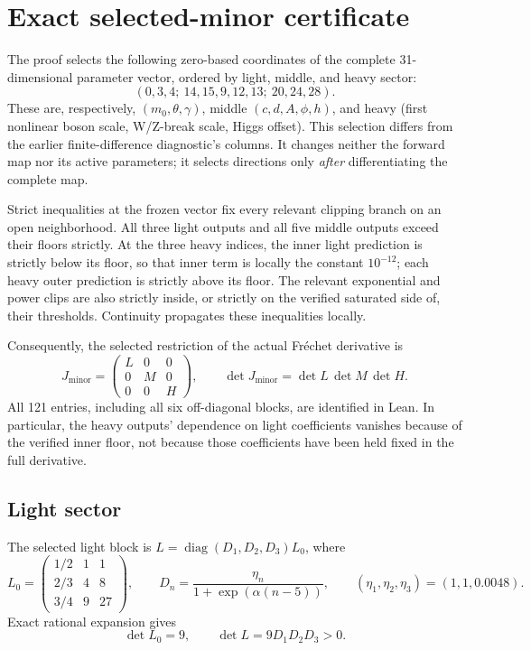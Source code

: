 \documentclass[11pt]{article}
\newcommand{\diag}{\operatorname{diag}}
\begin{document}
\section{Exact selected-minor certificate}
\label{sec:minor}

The proof selects the following zero-based coordinates of the complete
31-dimensional parameter vector, ordered by light, middle, and heavy sector:
\begin{equation}
 (0,3,4;\ 14,15,9,12,13;\ 20,24,28).
 \label{eq:selected}
\end{equation}
These are, respectively, $(m_0,\theta,\gamma)$, middle
$(c,d,A,\phi,h)$, and heavy (first nonlinear boson scale, W/Z-break
scale, Higgs offset). This selection differs from the earlier
finite-difference diagnostic's columns. It changes neither the forward
map nor its active parameters; it selects directions only \emph{after}
differentiating the complete map.

Strict inequalities at the frozen vector fix every relevant clipping
branch on an open neighborhood. All three light outputs and all five
middle outputs exceed their floors strictly. At the three heavy indices,
the inner light prediction is strictly below its floor, so that inner
term is locally the constant $10^{-12}$; each heavy outer prediction
is strictly above its floor. The relevant exponential and power clips
are also strictly inside, or strictly on the verified saturated side of,
their thresholds. Continuity propagates these inequalities locally.

Consequently, the selected restriction of the actual Fr\'echet derivative is
\begin{equation}
 J_{\mathrm{minor}}=
 \begin{pmatrix}L&0&0\\0&M&0\\0&0&H\end{pmatrix},
 \qquad \det J_{\mathrm{minor}}=\det L\,\det M\,\det H.
 \label{eq:block}
\end{equation}
All 121 entries, including all six off-diagonal blocks, are identified
in Lean. In particular, the heavy outputs' dependence on light coefficients
vanishes because of the verified inner floor, not because those coefficients
have been held fixed in the full derivative.

\subsection{Light sector}
The selected light block is $L=\diag(D_1,D_2,D_3)L_0$, where
\begin{equation}
 L_0=\begin{pmatrix}1/2&1&1\\2/3&4&8\\3/4&9&27\end{pmatrix},
 \qquad D_n=\frac{\eta_n}{1+\exp(\alpha(n-5))},
 \qquad (\eta_1,\eta_2,\eta_3)=(1,1,0.0048).
\end{equation}
Exact rational expansion gives
\begin{equation}
 \det L_0=9,\qquad \det L=9D_1D_2D_3>0.
 \label{eq:lightdet}
\end{equation}
\end{document}
